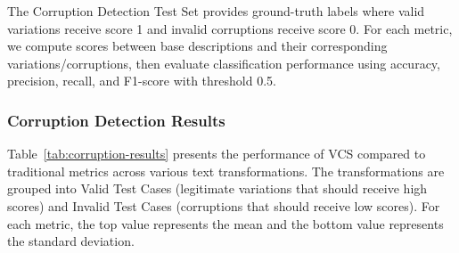 \documentclass[main.tex]{subfiles}
\begin{document}
The Corruption Detection Test Set provides ground-truth labels where valid variations receive score 1 and invalid corruptions receive score 0. For each metric, we compute scores between base descriptions and their corresponding variations/corruptions, then evaluate classification performance using accuracy, precision, recall, and F1-score with threshold 0.5.

\subsubsection{Corruption Detection Results}

Table~\ref{tab:corruption-results} presents the performance of VCS compared to traditional metrics across various text transformations. The transformations are grouped into Valid Test Cases (legitimate variations that should receive high scores) and Invalid Test Cases (corruptions that should receive low scores). For each metric, the top value represents the mean and the bottom value represents the standard deviation.
\end{document}
